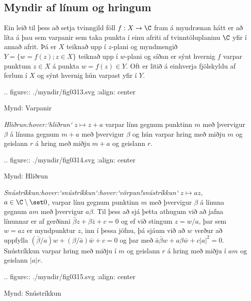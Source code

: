 \subsection*{Myndir af línum og hringum}

Ein  leið til þess að setja tvinngild föll
$f:X\to \C$ fram á myndrænan hátt
er að líta á þau sem varpanir sem taka punkta í einu afriti af
tvinntöluplaninu $\C$ yfir í annað afrit.  Þá er $X$ teiknað upp í
$z$-plani og myndmengið $Y=\{w=f(z); z\in X\}$ 
teiknað upp í $w$-plani og síðan er sýnt
hvernig $f$ varpar punktum $z\in X$ á punkta $w=f(z)\in Y$.
Oft er litið á einhverja fjölskyldu af ferlum í $X$ og sýnt hvernig hún
varpast yfir í $Y$. 


.. figure:: ./myndir/fig0313.svg
    :align: center

    Mynd: Varpanir




\smallskip\noindent
{\it Hliðrun:hover:`hliðrun`}  $z\mapsto z+a$ varpar línu gegnum punktinn $m$ með
þvervigur ${\beta}$  á línuna gegnum $m+a$ með þvervigur ${\beta}$ og
hún varpar hring með miðju $m$ og geislann $r$ á hring með miðju $m+a$
og geislann $r$.



.. figure:: ./myndir/fig0314.svg
    :align: center

    Mynd: Hliðrun




\smallskip\noindent
{\it Snústríkkun:hover:`snústríkkun`:hover:`vörpun!snústríkkun`}
$z\mapsto az$, $a\in \C\setminus \set 0$, varpar línu gegnum
punktinn $m$ með þvervigur ${\beta}$  á línuna gegnum $am$ með
þvervigur $a{\beta}$. Til þess að sjá þetta athugum við að jafna
línunnar er af gerðinni $\bar {\beta} z+{\beta}\bar z+c=0$ og ef við
stingum $z=w/a$, þar sem $w=az$ er myndpunktur $z$, inn í þessa
jöfnu, þá sjáum við að $w$ verður að uppfylla
$(\bar {\beta}/a) w+({\beta}/\bar a)\bar w+c=0$ og þar með
$\bar a\bar {\beta} w+a{\beta}\bar w+c|a|^2=0$.  
Snústríkkun varpar hring með miðju í $m$ og geislann $r$ á hring með
miðju í $am$ og geislann $|a|r$.


.. figure:: ./myndir/fig0315.svg
    :align: center

    Mynd: Snústríkkun




